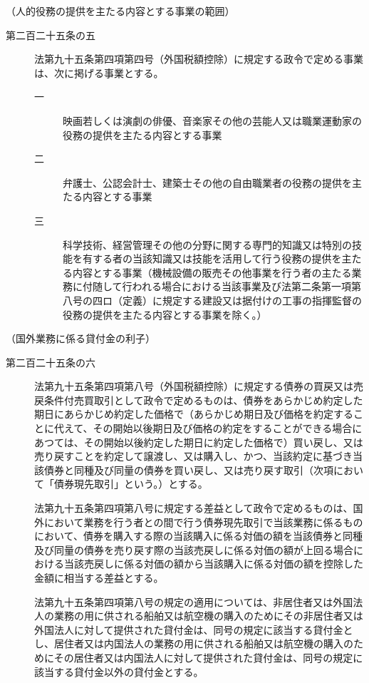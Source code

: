 \documentclass[twocolumn,a4j,10pt]{ltjtarticle}
\begin{document}
\noindent\hspace{10pt}（人的役務の提供を主たる内容とする事業の範囲）
\begin{description}
\item[第二百二十五条の五]法第九十五条第四項第四号（外国税額控除）に規定する政令で定める事業は、次に掲げる事業とする。
\begin{description}
\item[一]映画若しくは演劇の俳優、音楽家その他の芸能人又は職業運動家の役務の提供を主たる内容とする事業
\item[二]弁護士、公認会計士、建築士その他の自由職業者の役務の提供を主たる内容とする事業
\item[三]科学技術、経営管理その他の分野に関する専門的知識又は特別の技能を有する者の当該知識又は技能を活用して行う役務の提供を主たる内容とする事業（機械設備の販売その他事業を行う者の主たる業務に付随して行われる場合における当該事業及び法第二条第一項第八号の四ロ（定義）に規定する建設又は据付けの工事の指揮監督の役務の提供を主たる内容とする事業を除く。）
\end{description}
\end{description}
\noindent\hspace{10pt}（国外業務に係る貸付金の利子）
\begin{description}
\item[第二百二十五条の六]法第九十五条第四項第八号（外国税額控除）に規定する債券の買戻又は売戻条件付売買取引として政令で定めるものは、債券をあらかじめ約定した期日にあらかじめ約定した価格で（あらかじめ期日及び価格を約定することに代えて、その開始以後期日及び価格の約定をすることができる場合にあつては、その開始以後約定した期日に約定した価格で）買い戻し、又は売り戻すことを約定して譲渡し、又は購入し、かつ、当該約定に基づき当該債券と同種及び同量の債券を買い戻し、又は売り戻す取引（次項において「債券現先取引」という。）とする。
\item[]法第九十五条第四項第八号に規定する差益として政令で定めるものは、国外において業務を行う者との間で行う債券現先取引で当該業務に係るものにおいて、債券を購入する際の当該購入に係る対価の額を当該債券と同種及び同量の債券を売り戻す際の当該売戻しに係る対価の額が上回る場合における当該売戻しに係る対価の額から当該購入に係る対価の額を控除した金額に相当する差益とする。
\item[]法第九十五条第四項第八号の規定の適用については、非居住者又は外国法人の業務の用に供される船舶又は航空機の購入のためにその非居住者又は外国法人に対して提供された貸付金は、同号の規定に該当する貸付金とし、居住者又は内国法人の業務の用に供される船舶又は航空機の購入のためにその居住者又は内国法人に対して提供された貸付金は、同号の規定に該当する貸付金以外の貸付金とする。
\end{description}
\end{document}
